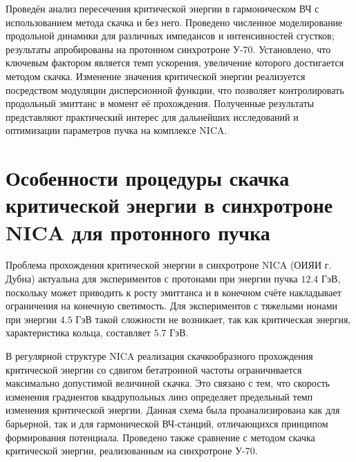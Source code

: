 \par Проведён анализ пересечения критической энергии в гармоническом ВЧ с использованием метода скачка и без него. Проведено численное моделирование продольной динамики для различных импедансов и интенсивностей сгустков; результаты апробированы на протонном синхротроне У-70. Установлено, что ключевым фактором является темп ускорения, увеличение которого достигается методом скачка. Изменение значения критической энергии реализуется посредством модуляции дисперсионной функции, что позволяет контролировать продольный эмиттанс в момент её прохождения. Полученные результаты представляют практический интерес для дальнейших исследований и оптимизации параметров пучка на комплексе NICA.

\section{Особенности процедуры скачка критической энергии в синхротроне NICA для протонного пучка}

\par Проблема прохождения критической энергии в синхротроне NICA (ОИЯИ г. Дубна) актуальна для экспериментов с протонами при энергии пучка $12.4$ ГэВ, поскольку может приводить к росту эмиттанса и в конечном счёте накладывает ограничения на конечную светимость. Для экспериментов с тяжелыми ионами при энергии $4.5$ ГэВ такой сложности не возникает, так как критическая энергия, характеристика кольца, составляет $5.7$ ГэВ. 

\par В регулярной структуре NICA реализация скачкообразного прохождения критической энергии со сдвигом бетатронной частоты ограничивается максимально допустимой величиной скачка. Это связано с тем, что скорость изменения градиентов квадрупольных линз определяет предельный темп изменения критической энергии. Данная схема была проанализирована как для барьерной, так и для гармонической ВЧ-станций, отличающихся принципом формирования потенциала. Проведено также сравнение с методом скачка критической энергии, реализованным на синхротроне У-70.

